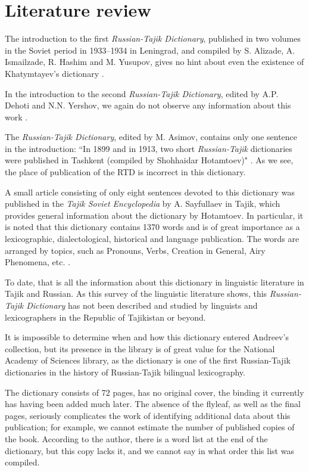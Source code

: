\documentclass[output=paper,colorlinks,citecolor=brown,arabicfont,chinesefont]{langscibook}
\begin{document}
\section{Literature review}

The introduction to the first \emph{Russian-Tajik Dictionary}, published in two volumes in the Soviet period in 1933--1934 in Leningrad, and compiled by S. Alizade, A. Ismailzade, R. Hashim and M. Yusupov, gives no hint about even the existence of Khatymtayev's dictionary  \citep[5--6]{Alizade1933}.

In the introduction to the second \emph{Russian-Tajik Dictionary}, edited by A.P. Dehoti and N.N. Yershov, we again do not observe any information about this work \citep[5--6]{DehotiYershov1949}.

The \citeyear{Asimov1985} \emph{Russian-Tajik Dictionary}, edited by M. Asimov, contains only one sentence in the introduction: “In 1899  and in 1913, two short \emph{Russian-Tajik} dictionaries were published in Tashkent (compiled by Shohhaidar Hotamtoev)" \citep[7]{Asimov1985}. As we see, the place of publication of the RTD is incorrect in this dictionary.

A small article consisting of only eight sentences devoted to this dictionary was published in the \emph{Tajik Soviet Encyclopedia} by A. Sayfullaev in Tajik, which provides general information about the dictionary by Hotamtoev. In particular, it is noted that this dictionary contains 1370 words and is of great importance as a lexicographic, dialectological, historical and language publication. The words are arranged by topics, such as Pronouns, Verbs, Creation in General, Airy Phenomena, etc. \citep[72]{Sayfullaev1983}.

To date, that is all the information about this dictionary in linguistic literature in Tajik and Russian. As this survey of the linguistic literature shows, this \emph{Russian-Tajik Dictionary} has not been described and studied by linguists and lexicographers in the Republic of Tajikistan or beyond.

It is impossible to determine when and how this dictionary entered Andreev’s collection, but its presence in the library is of great value for the National Academy of Sciences library, as the dictionary is one of the first Russian-Tajik dictionaries in the history of Russian-Tajik bilingual lexicography.

The dictionary consists of 72 pages, has no original cover, the binding it currently has having been added much later. The absence of the flyleaf, as well as the final pages, seriously complicates the work of identifying additional data about this publication; for example, we cannot estimate the number of published copies of the book. According to the author, there is a word list at the end of the dictionary, but this copy lacks it, and we cannot say in what order this list was compiled.
\end{document}
